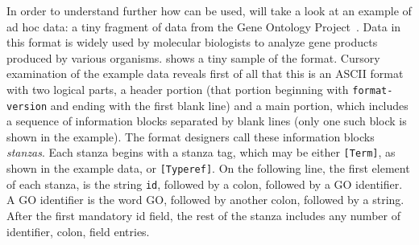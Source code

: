 \documentclass[11pt]{article}
\begin{document}


In order to understand further how \pads{} can be used,
will take a look at an example of ad hoc data:
a tiny fragment of data from the Gene Ontology Project~\cite{geneontology}.  
Data in this format is widely used by molecular biologists to
analyze gene products produced by various organisms.
 shows a tiny sample of
the format.  Cursory examination of the example data reveals
first of all that this is an ASCII format with two 
logical parts, a header portion (that portion beginning with
\texttt{format-version} and ending with the first blank line)
and a main portion, which includes a sequence of 
information blocks separated by blank lines (only one such block 
is shown in the example).  The format
designers call these information blocks {\em stanzas}.
Each stanza begins with a stanza tag, which may be either
\texttt{[Term]}, as shown in the example data, or
\texttt{[Typeref]}.  On the following line,
the first element of each stanza, is
the string \texttt{id}, followed by a colon, followed by a
GO identifier.  A GO identifier is the word GO, followed
by another colon, followed by a string.  
After the first mandatory id field, the rest of the stanza includes
any number of identifier, colon, field entries.
\end{document}
